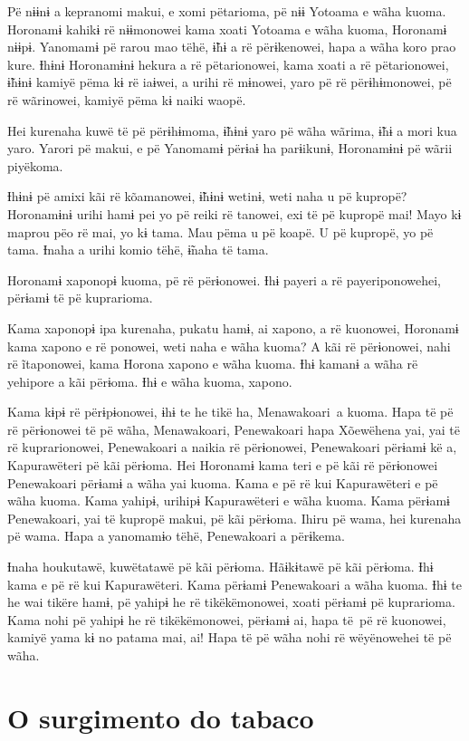 Pë nɨɨnɨ a kepranomi makui, e xomi pëtarioma, pë nɨɨ Yotoama e wãha
kuoma. Horonamɨ kahikɨ rë nɨɨmonowei kama xoati Yotoama e wãha kuoma,
Horonamɨ nɨɨpɨ. Yanomamɨ pë rarou mao tëhë, ɨ̃hɨ a rë përɨkenowei, hapa a
wãha koro prao kure. Ɨhɨnɨ Horonamɨnɨ hekura a rë pëtarionowei, kama
xoati a rë pëtarionowei, ɨ̃hɨnɨ kamiyë pëma kɨ rë iaɨwei, a urihi rë
mɨnowei, yaro pë rë përɨhɨmonowei, pë rë wãrinowei, kamiyë pëma kɨ naiki
waopë. 

Hei kurenaha kuwë të pë përɨhɨmoma, ɨ̃hɨnɨ yaro pë wãha wãrima, ɨ̃hɨ a
mori kua yaro. Yarori pë makui, e pë Yanomamɨ përɨaɨ ha parɨikunɨ,
Horonamɨnɨ pë wãrii piyëkoma. 

Ɨhɨnɨ pë amixi kãi rë kõamanowei, ɨ̃hɨnɨ wetinɨ, weti naha u pë kupropë?
Horonamɨnɨ urihi hamɨ pei yo pë reiki rë tanowei, exi të pë kupropë mai!
Mayo kɨ maprou pëo rë mai, yo kɨ tama. Mau pëma u pë koapë. U pë
kupropë, yo pë tama. Ɨnaha a urihi komio tëhë, ɨ̃naha të tama. 

Horonamɨ xaponopɨ kuoma, pë rë përɨonowei. Ɨhɨ payeri a rë
payeriponowehei, përɨamɨ të pë kuprarioma. 

Kama xaponopɨ ipa kurenaha, pukatu hamɨ, ai xapono, a rë kuonowei,
Horonamɨ kama xapono e rë ponowei, weti naha e wãha kuoma? A kãi rë
përɨonowei, nahi rë ĩtaponowei, kama Horona xapono e wãha kuoma. Ɨhɨ
kamanɨ a wãha rë yehipore a kãi përɨoma. Ɨhɨ e wãha kuoma, xapono. 

Kama kɨpɨ rë përɨpɨonowei, ɨhɨ te he tikë ha, Menawakoari~a kuoma. Hapa
të pë rë përɨonowei të pë wãha, Menawakoari, Penewakoari hapa Xõewëhena
yai, yai të rë kuprarionowei, Penewakoari a naikia rë përɨonowei,
Penewakoari përɨamɨ kë a, Kapurawëteri pë kãi përɨoma. Hei Horonamɨ kama
teri e pë kãi rë përɨonowei Penewakoari përɨamɨ a wãha yai kuoma. Kama e
pë rë kui Kapurawëteri e pë wãha kuoma. Kama yahipɨ, urihipɨ
Kapurawëteri e wãha kuoma. Kama përɨamɨ Penewakoari, yai të kupropë
makui, pë kãi përɨoma. Ihiru pë wama, hei kurenaha pë wama. Hapa a
yanomamɨo tëhë, Penewakoari a përɨkema.

Ɨnaha houkutawë, kuwëtatawë pë kãi përɨoma. Hãɨkɨtawë pë kãi përɨoma.
Ɨhɨ kama e pë rë kui Kapurawëteri. Kama përɨamɨ Penewakoari a wãha
kuoma. Ɨhɨ te he wai tikëre hamɨ, pë yahipɨ he rë tikëkëmonowei, xoati
përɨamɨ pë kuprarioma. Kama nohi pë yahipɨ he rë tikëkëmonowei, përɨamɨ
ai, hapa të~pë rë kuonowei, kamiyë yama kɨ no patama mai, ai! Hapa të pë
wãha nohi rë wëyënowehei të pë wãha.
 
\chapter{O surgimento do tabaco}
 
